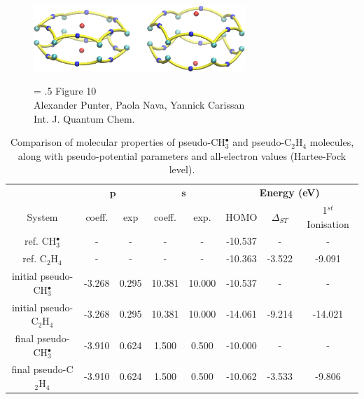 \documentclass[12pt]{article}
\begin{document}
\begin{figure}
\begin{center}
\includegraphics[width=8cm]{aim_c6h6.eps}
\end{center}
{\Large
\begin{minipage}[t]{3in}
\baselineskip = .5\baselineskip
Figure 10 \\
Alexander Punter, Paola Nava, Yannick Carissan\\
Int. J. Quantum Chem.
\end{minipage}
}
\end{figure}

\clearpage

\begin{table}[h]
\caption{\label{table:potential_params} Comparison of molecular properties of pseudo-CH$^{\bullet}_{3}$ and pseudo-C$_{2}$H$_{4}$ molecules, along with pseudo-potential parameters and all-electron values (Hartee-Fock level).}
\begin{tabular}{| c | c | c | c | c | c | c | c| }
\hline
 & \multicolumn{2}{c}{\textbf{$\bm{p}$}} & \multicolumn{2}{c|}{$\bm{s}$} & \multicolumn{3}{c|}{\textbf{Energy (eV)}} \\
System & coeff. & exp & coeff. & exp. & HOMO & $\Delta_{ST}$ & 1$^{st}$ Ionisation \\
\hline
ref. CH$^{\bullet}_{3}$ & - & - & - & - & -10.537 & - & - \\
ref. C$_{2}$H$_{4}$ & - & - & - & - & -10.363 & -3.522 & -9.091 \\
\hline
initial pseudo-CH$^{\bullet}_{3}$ & -3.268 & 0.295 & 10.381 & 10.000 & -10.537 & - & - \\
initial pseudo-C$_{2}$H$_{4}$ & -3.268 & 0.295 & 10.381 & 10.000 & -14.061 & -9.214 & -14.021\\
\hline
final pseudo-CH$^{\bullet}_{3}$ & -3.910 & 0.624 & 1.500 & 0.500 & -10.000 & - & - \\
final pseudo-C$_{2}$H$_{4}$ & -3.910 & 0.624 & 1.500 & 0.500 & -10.062 & -3.533 & -9.806 \\
\hline
\end{tabular}
\end{table}


\newpage
\end{document}
